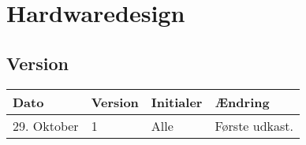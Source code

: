\chapter{Hardwaredesign}
\section*{Version}
\begin{table}[h]
	\centering
	\begin{tabularx}{\textwidth - 2cm}{|l|l|l|X|}
	\hline
	Dato			& Version			& Initialer 		& Ændring										\\ \hline
	29. Oktober 	& 1 				& Alle				& Første udkast. 								\\ \hline
	\end{tabularx}
\end{table}
\clearpage


